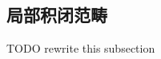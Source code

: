 \subsection{局部积闭范畴} %
TODO rewrite this subsection
\begin{comment}
1984年, Seely在一篇文章~\cite{seely:1984:lccc}中
指出, 局部积闭范畴可以和依值类型论中的许多
东西找到对应. \ref{beginning:ccc}~节中已经
介绍了积闭范畴的概念, 而\emph{局部积闭范畴}
只需要进一步的定义.
\begin{definition}
给定范畴 \(\mathcal C\) 中的对象 \(A\),
定义\textbf{俯范畴}(overcategory或slice category)
\(\mathcal C_{/A}\) 的对象为所有形如
\(B \xrightarrow{f} A\) 的态射. 两个对象
\(B \xrightarrow f A\) 与 \(C \xrightarrow g A\)
之间的态射为使得 \(g \circ h = f\) 成立的 \(h\) 的集合.
\end{definition}
这里的 “局部” 指的就是在俯范畴中的构造. 可以在
集合范畴的俯范畴中获取一些直觉： 每个箭头
\(f : B \to A\) 实际上把 \(B\) 拆分成了许多子集
\(B_x = f^{-1}\{x\}\). 而俯范畴 \(\textsf{Set}_{/A}\)
中的所有构造实际上都是这些子集上逐点的构造. 比如
\(B \to A\) 与 \(C \to A\) 在俯范畴中的乘积
\(D \to A\), 满足 \(D_x = B_x \times C_x\).
因此这也称为\textbf{纤维积}, 因为这恰好是每个 \(x\)
的原像 (即 \(x\) 上的\emph{纤维}) 乘起来. 在原范畴
中, 这就是拉回.
\begin{definition}
如果某个范畴的所有俯范畴都积闭, 则称这个
范畴\textbf{局部积闭}.
\end{definition}
特别地, 这个范畴需要有所有的拉回. 如果这个范畴含有终对象
\(1\), 那么 \(\mathcal C_{/1} \cong \mathcal C\),
从而其本身是积闭的.

如果 \(f\) 是局部积闭范畴 \(\mathcal C\)
中的对象, 那么我们立即有一个函子
\[f_! : \mathcal C_{/B} \to \mathcal C_{/A}\]
描述了箭头的复合. 而由于存在所有的拉回, 有另外一个函子
\[f^* : \mathcal C_{/A} \to \mathcal C_{/B}\]
把每个箭头 (即 \(\mathcal C_{/A}\) 中的对象) 与
\(f\) 取拉回. 进一步由于存在局部的函数对象, 可以构造
第三个函子
\[f_* : \mathcal C_{/B} \to \mathcal C_{/A}.\]
事实上, 这三个函子构成伴随链\(f_!\dashv f^*\dashv f_*\).
读者可以阅读本人的一篇文章~\cite{me:2022:lccc}, 是对局部
积闭范畴, 以及其对应的伴随函子 \(f_!\dashv
f^*\dashv f_*\) 的一份比较友好的介绍. 事实上, 这三个
函子可以给出局部积闭范畴的等价定义.
\begin{theorem}
任给一个范畴, 则其中所有的态射 \(f\) 都一定有对应的
\(f_!\) 函子. 这个范畴是积闭的, 等价于
每个 \(f_!\) 函子都存在连续的两个伴随函子
\[f_!\dashv f^*\dashv f_*.\]
\end{theorem}


\end{comment}
